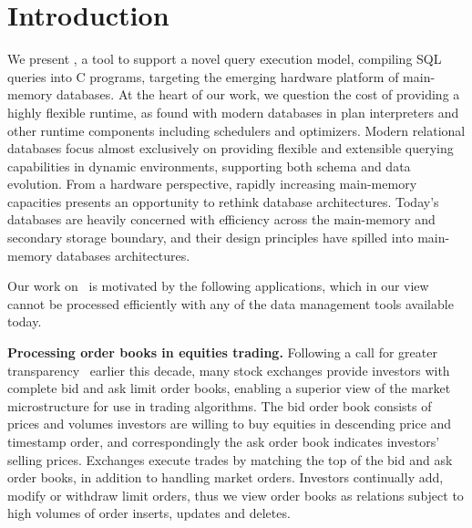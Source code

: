 \section{Introduction}
We present \compiler, a tool to support a novel query execution model, compiling
SQL queries into C programs, targeting the emerging hardware platform of
main-memory databases. At the heart of our work, we question the cost of
providing a highly flexible runtime, as found with modern databases in plan
interpreters and other runtime components including schedulers and optimizers.
Modern relational databases focus almost exclusively on providing flexible and
extensible querying capabilities in dynamic environments, supporting both schema
and data evolution. From a hardware perspective, rapidly increasing main-memory
capacities presents an opportunity to rethink database architectures. Today's
databases are heavily concerned with efficiency across the main-memory and
secondary storage boundary, and their design principles have spilled
into main-memory databases architectures.

Our work on \compiler\ is motivated by the following applications, which in
our view cannot be processed efficiently with any of the data management tools
available today.

\noindent \textbf{Processing order books in equities trading.}
Following a call for greater transparency~\cite{sec-orderbook:00} earlier this
decade, many stock exchanges provide investors with complete bid and ask limit
order books, enabling a superior view of the market microstructure for use in
trading algorithms. The bid order book consists of prices and volumes investors
are willing to buy equities in descending price and timestamp order, and
correspondingly the ask order book indicates investors' selling prices. Exchanges
execute trades by matching the top of the bid and ask order books, in addition to
handling market orders. Investors continually add, modify or withdraw limit
orders, thus we view order books as relations subject to high volumes of order
inserts, updates and deletes.

